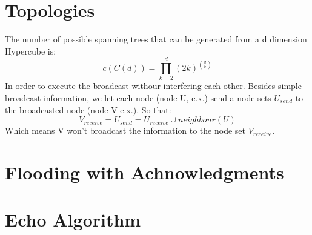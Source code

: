\documentclass[a4paper, 14pt]{article}
\begin{document}
\section{Topologies}
The number of possible spanning trees that can be generated from a d
dimension Hypercube is:\\
\begin{equation}
c(C(d)) = \prod_{k=2}^{d}(2k)^{d \choose k}
\end{equation}
In order to execute the broadcast withour interfering each
other. Besides simple broadcast information, we let each node (node U,
e.x.) send a node sets $U_{send}$ to the broadcasted node (node V
e.x.). So that:\\
\begin{equation}
V_{receive} = U_{send} = U_{receive} \cup neighbour(U)
\end{equation}
Which means V won't broadcast the information to the node set
$V_{receive}$. \\
\section{Flooding with Achnowledgments}
\section{Echo Algorithm}
\end{document}
